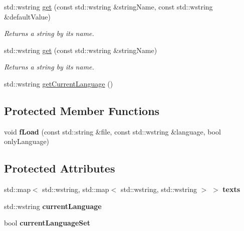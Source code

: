 \begin{DoxyCompactItemize}
std\+::wstring \hyperlink{classzt_1_1_text_a1bdb417d6193ab286e65cbcff36ec84f}{get} (const std\+::wstring \&string\+Name, const std\+::wstring \&default\+Value)
\begin{DoxyCompactList}\small\item\em Returns a string by its name. \end{DoxyCompactList}\item 
std\+::wstring \hyperlink{classzt_1_1_text_aa02ab4ea1b6e1c1eaf85d351ad2a7856}{get} (const std\+::wstring \&string\+Name)
\begin{DoxyCompactList}\small\item\em Returns a string by its name. \end{DoxyCompactList}\item 
std\+::wstring \hyperlink{classzt_1_1_text_ab2f3d33611e50977d0002d22d03b823a}{get\+Current\+Language} ()
\end{DoxyCompactItemize}
\subsection*{Protected Member Functions}
\begin{DoxyCompactItemize}
\item 
\mbox{\label{classzt_1_1_text_ace7d569454f57777309c1ae929c6291e}} 
void {\bfseries f\+Load} (const std\+::string \&file, const std\+::wstring \&language, bool only\+Language)
\end{DoxyCompactItemize}
\subsection*{Protected Attributes}
\begin{DoxyCompactItemize}
\item 
\mbox{\label{classzt_1_1_text_a9c13dc94abb397eff6b4e81fca226e1f}} 
std\+::map$<$ std\+::wstring, std\+::map$<$ std\+::wstring, std\+::wstring $>$ $>$ {\bfseries texts}
\item 
\mbox{\label{classzt_1_1_text_ab2b6b15ea6141bb5c0ffc8cf128b6150}} 
std\+::wstring {\bfseries current\+Language}
\item 
\mbox{\label{classzt_1_1_text_a4b786dae044d3b0651a621b937e05027}} 
bool {\bfseries current\+Language\+Set}
\end{DoxyCompactItemize}


